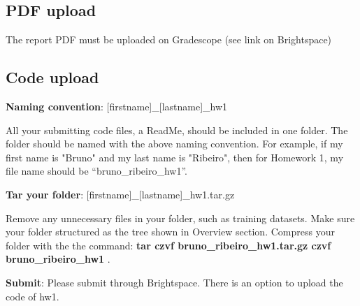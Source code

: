 \documentclass{article}
\newcommand{\homeworknumber}{1}
\begin{document}
\hfill

\subsection*{\bf PDF upload}

The report PDF must be uploaded on Gradescope (see link on Brightspace)

\hfill


\subsection*{\bf Code upload}

\noindent \textbf{Naming convention}: [firstname]\_[lastname]\_hw\homeworknumber

All your submitting code files, a ReadMe, should be included in one folder. The folder should be named with the above naming convention. For example, if my first name is "Bruno" and my last name is "Ribeiro", then for Homework \homeworknumber, my file name should be ``bruno\_ribeiro\_hw\homeworknumber''.


\hfill

\noindent \textbf{Tar your folder}: [firstname]\_[lastname]\_hw\homeworknumber.tar.gz

Remove any unnecessary files in your folder, such as training datasets. Make sure your folder structured as the tree shown in Overview section. Compress your folder with the the command: \textbf{tar czvf bruno\_ribeiro\_hw\homeworknumber.tar.gz czvf bruno\_ribeiro\_hw\homeworknumber} .

\hfill

\noindent \textbf{Submit}: 
Please submit through Brightspace. There is an option to upload the code of hw\homeworknumber.



\end{document}
